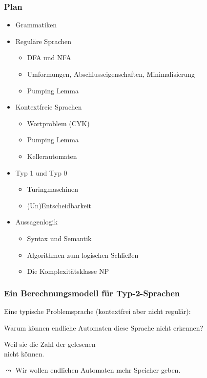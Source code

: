 \documentclass[onlymath]{beamer}
\begin{document}
\begin{frame}\frametitle{Plan}

\begin{itemize}
\item \alert{Grammatiken}
\item \alert{Reguläre Sprachen}
\begin{itemize}
\item DFA und NFA
\item Umformungen, Abschlusseigenschaften, Minimalisierung
\item Pumping Lemma
\end{itemize}
\item \alert{Kontextfreie Sprachen}
\begin{itemize}
\item Wortproblem (CYK)
\item Pumping Lemma
\item Kellerautomaten
\end{itemize}\pause
\item \alert{Typ 1 und Typ 0}
\begin{itemize}
\item Turingmaschinen
\item (Un)Entscheidbarkeit
\end{itemize}
\item \alert{Aussagenlogik}
\begin{itemize}
\item Syntax und Semantik
\item Algorithmen zum logischen Schließen
\item Die Komplexitätsklasse NP
\end{itemize}
\end{itemize}

\end{frame}


\begin{frame}\frametitle{Ein Berechnungsmodell für Typ-2-Sprachen}

Eine typische Problemsprache (kontextfrei aber nicht regulär):
\medskip

\bigskip

Warum können endliche Automaten diese Sprache nicht erkennen?\pause

\begin{center}
\alert{{\large Weil sie die Zahl der gelesenen \\nicht {} können.}}
\end{center}

$\leadsto$ Wir wollen endlichen Automaten mehr Speicher geben.

\end{frame}
\end{document}
